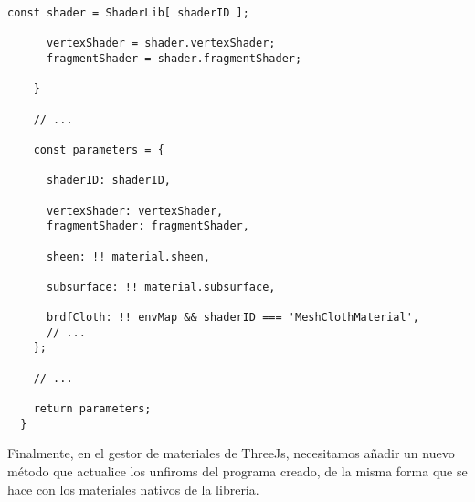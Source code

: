 \begin{lstlisting}[caption=Clase MeshClothMaterial]
      const shader = ShaderLib[ shaderID ];

      vertexShader = shader.vertexShader;
      fragmentShader = shader.fragmentShader;

    }

    // ...

    const parameters = {

      shaderID: shaderID,

      vertexShader: vertexShader,
      fragmentShader: fragmentShader,

      sheen: !! material.sheen,

      subsurface: !! material.subsurface,

      brdfCloth: !! envMap && shaderID === 'MeshClothMaterial',
      // ...
    };

    // ...

    return parameters;
  }
\end{lstlisting}

Finalmente, en el gestor de materiales de ThreeJs, necesitamos a\~nadir un nuevo m\'etodo
que actualice los unfiroms del programa creado, de la misma forma que se hace con los
materiales nativos de la librer\'ia.\newline

